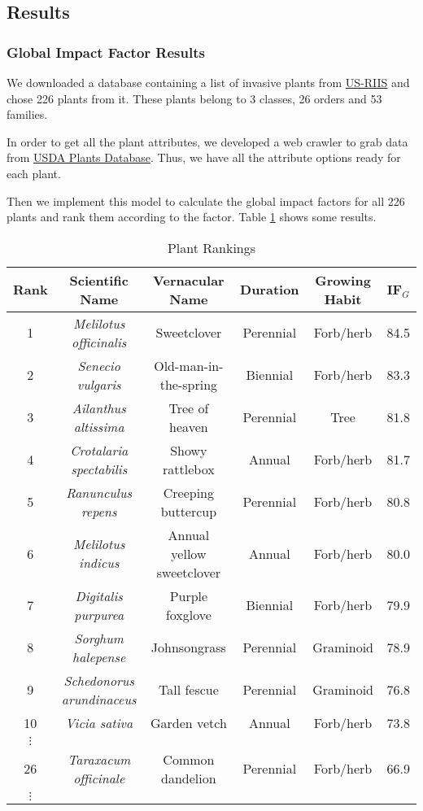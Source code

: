 \documentclass[12pt]{article}
\begin{document}
	\subsection{Results}
	\subsubsection{Global Impact Factor Results}
		
		We downloaded a database containing a list of invasive plants from \href{https://www.sciencebase.gov/catalog/item/5b911a5ce4b0702d0e808588}{US-RIIS}\autocite{US-RIIS} and chose 226 plants from it.  These plants belong to 3 classes, 26 orders and 53 families.
		
		In order to get all the plant attributes, we developed a web crawler to grab data from \href{https://plants.usda.gov/home/}{USDA Plants Database}\autocite{USDA}.  Thus, we have all the attribute options ready for each plant.
		
		Then we implement this model to calculate the global impact factors for all 226 plants and rank them according to the factor.  Table \ref{tb:ranks} shows some results.
		
		{
			\fontsize{10}{14}\selectfont
			{
				\begin{longtable}{cccccc}
					\caption{Plant Rankings}
					\label{tb:ranks}\\
					
					\toprule
					Rank&Scientific Name&Vernacular Name&Duration&Growing Habit&IF$_G$\\
					\toprule
					1&\textit{Melilotus officinalis}&Sweetclover&Perennial&Forb/herb&84.5\\
					2&\textit{Senecio vulgaris}&Old-man-in-the-spring&Biennial&Forb/herb&83.3\\
					3&\textit{Ailanthus altissima}&Tree of heaven&Perennial&Tree&81.8\\
					4&\textit{Crotalaria spectabilis}&Showy rattlebox&Annual&Forb/herb&81.7\\
					5&\textit{Ranunculus repens}&Creeping buttercup&Perennial&Forb/herb&80.8\\
					6&\textit{Melilotus indicus}&Annual yellow sweetclover&Annual&Forb/herb&80.0\\
					7&\textit{Digitalis purpurea}&Purple foxglove&Biennial&Forb/herb&79.9\\
					8&\textit{Sorghum halepense}&Johnsongrass&Perennial&Graminoid&78.9\\
					9&\textit{Schedonorus arundinaceus}&Tall fescue&Perennial&Graminoid&76.8\\
					10&\textit{Vicia sativa}&Garden vetch&Annual&Forb/herb&73.8\\
					$\vdots$\\
					26&\textit{Taraxacum officinale}&Common dandelion&Perennial&Forb/herb&66.9\\
					$\vdots$\\
					\bottomrule
				\end{longtable}
			}
		}
		
\end{document}
